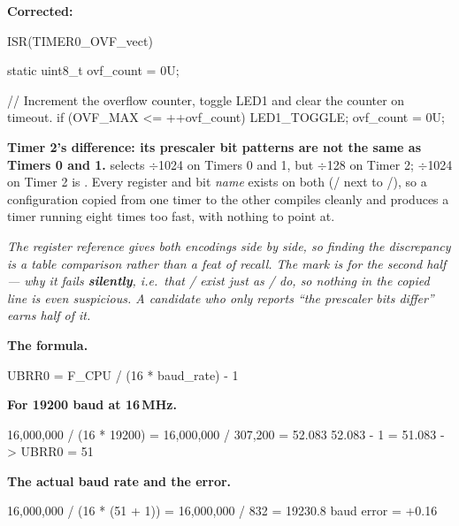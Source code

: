 \textbf{Corrected:}

\begin{ccode}
ISR(TIMER0_OVF_vect)
{
    static uint8_t ovf_count = 0U;

    // Increment the overflow counter, toggle LED1 and clear the counter on timeout.
    if (OVF_MAX <= ++ovf_count)
    {
        LED1_TOGGLE;
        ovf_count = 0U;
    }
}
\end{ccode}

\textbf{Timer 2's difference: its prescaler bit patterns are not the same as Timers 0 and 1.}
 selects $\div$1024 on Timers 0 and 1, but $\div$128 on Timer 2; $\div$1024 on Timer 2 is
. Every register and bit \emph{name} exists on both (/ next to
/), so a configuration copied from one timer to the other compiles cleanly and
produces a timer running eight times too fast, with nothing to point at. 

\textit{The register reference gives both encodings side by side, so finding the discrepancy is a
table comparison rather than a feat of recall. The mark is for the second half --- why it fails
\textbf{silently}, i.e.\ that / exist just as / do, so
nothing in the copied line is even suspicious. A candidate who only reports ``the prescaler bits
differ'' earns half of it.}


\textbf{The formula.} 

\begin{console}
UBRR0 = F_CPU / (16 * baud_rate) - 1
\end{console}

\textbf{For 19200 baud at 16\,MHz.} 

\begin{console}
16,000,000 / (16 * 19200) = 16,000,000 / 307,200 = 52.083
52.083 - 1 = 51.083  ->  UBRR0 = 51
\end{console}

\textbf{The actual baud rate and the error.} 

\begin{console}
16,000,000 / (16 * (51 + 1)) = 16,000,000 / 832 = 19230.8 baud
error = +0.16 %
\end{console}

